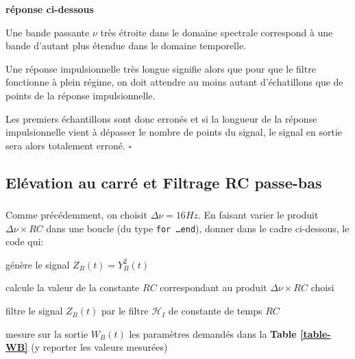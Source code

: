 \documentclass{article}
\newcommand{\dnu}{16}
\newcommand{\debutrep}[1]{\color{blue}\begin{center} \hrulefill \textbf{ #1 } \hrulefill \end{center} }
\newcommand{\finrep}{\vspace*{5mm}\hfill $\square$\color{black}\vspace*{5mm}}
\begin{document}
\debutrep{réponse ci-dessous}
Une bande passante $\nu$ très étroite dans le domaine spectrale correspond à une bande d'autant plus étendue dans le domaine temporelle.

Une réponse impulsionnelle très longue signifie alors que pour que le filtre fonctionne à plein régime, on doit attendre au moins autant d'échatillons que de points de la réponse impulsionnelle.

Les premiers échantillons sont donc erronés et si la longueur de la réponse impulsionnelle vient à dépasser le nombre de points du signal, le signal en sortie sera alors totalement erroné.
\finrep


\subsection{Elévation au carré et Filtrage RC passe-bas}

\subsubsection{}

Comme précédemment, on choisit $\Delta\nu = \dnu Hz$. En faisant varier le produit $\Delta \nu \times RC$ dans une boucle (du type {\tt for \ldots end}), donner dans le cadre ci-dessous, le code qui:

\begin{list}{-}{\setlength{\leftmargin}{3mm} \setlength{\labelwidth}{20mm} \setlength{\labelsep}{2mm} \setlength{\itemsep}{1mm} }
\item génère le signal $Z_B(t)= Y_B^2(t)$ 
\item calcule la valeur de la constante $RC$ correspondant au produit $\Delta\nu \times RC$ choisi
\item filtre le signal $Z_B(t)$ par le filtre $\mathcal{H}_{I}$ de constante de temps $RC$  
\item mesure sur la sortie $W_B(t)$ les paramètres demandés dans la  \textbf{Table \ref{table-WB}} (y reporter les valeurs mesurées)
\end{list}
\end{document}
